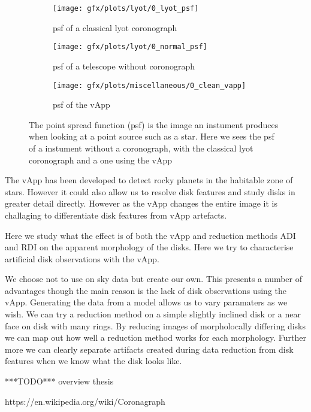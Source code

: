 \begin{figure}[h!]
      \begin{subfigure}[t]{0.5 \textwidth}
        \texttt{[image: gfx/plots/lyot/0\_lyot\_psf]}
        \label{fig:lyot}
        \caption{psf of a classical lyot coronograph}
      \end{subfigure}%
      \begin{subfigure}[t]{0.5\textwidth}
        \texttt{[image: gfx/plots/lyot/0\_normal\_psf]}
        \caption{psf of a telescope without coronograph}
      \end{subfigure}
      
      \begin{subfigure}[]{0.5\textwidth}
        \texttt{[image: gfx/plots/miscellaneous/0\_clean\_vapp]}
        \caption{psf of the vApp}
      \end{subfigure}
      
  \caption{The point spread function (psf) is the image an instument produces when looking at a point source such as a star. Here we sees the psf of a instument without a coronograph, with the classical lyot coronograph and a one using the vApp }
  \label{fig:vapp_vs_lyot}
\end{figure}

The vApp has been developed to detect rocky planets in the habitable zone of stars. However it could also allow us to resolve disk features and study disks in greater detail directly. However as the vApp changes the entire image it is challaging to differentiate disk features from vApp artefacts. 

Here we study what the effect is of both the vApp and reduction methods ADI and RDI on the apparent morphology of the disks. Here we try to characterise artificial disk observations with the vApp.

We choose not to use on sky data but create our own. This presents a number of advantages though the main reason is the lack of disk observations using the vApp. Generating the data from a model allows us to vary paramaters as we wish. We can try a reduction method on a simple slightly inclined disk or a near face on disk with many rings. By reducing images of morpholocally differing disks we can map out how well a reduction method works for each morphology. Further more we can clearly separate artifacts created during data reduction from disk features when we know what the disk looks like.

***TODO***
overview thesis


https://en.wikipedia.org/wiki/Coronagraph
